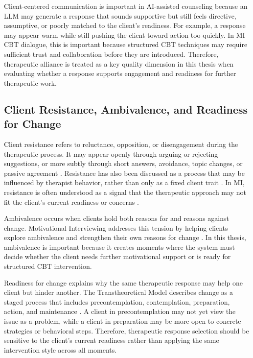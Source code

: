 Client-centered communication is important in AI-assisted counseling because an LLM may generate a response that sounds supportive but still feels directive, assumptive, or poorly matched to the client's readiness. For example, a response may appear warm while still pushing the client toward action too quickly. In MI-CBT dialogue, this is important because structured CBT techniques may require sufficient trust and collaboration before they are introduced. Therefore, therapeutic alliance is treated as a key quality dimension in this thesis when evaluating whether a response supports engagement and readiness for further therapeutic work.

\subsection{Client Resistance, Ambivalence, and Readiness for Change}

Client resistance refers to reluctance, opposition, or disengagement during the therapeutic process. It may appear openly through arguing or rejecting suggestions, or more subtly through short answers, avoidance, topic changes, or passive agreement \cite{patterson1985therapist,patterson1994functional}. Resistance has also been discussed as a process that may be influenced by therapist behavior, rather than only as a fixed client trait \cite{beutler2002resistance}. In MI, resistance is often understood as a signal that the therapeutic approach may not fit the client's current readiness or concerns \cite{miller2013motivational}.

Ambivalence occurs when clients hold both reasons for and reasons against change. Motivational Interviewing addresses this tension by helping clients explore ambivalence and strengthen their own reasons for change \cite{miller2013motivational,bischof2021motivational}. In this thesis, ambivalence is important because it creates moments where the system must decide whether the client needs further motivational support or is ready for structured CBT intervention.

Readiness for change explains why the same therapeutic response may help one client but hinder another. The Transtheoretical Model describes change as a staged process that includes precontemplation, contemplation, preparation, action, and maintenance \cite{prochaska1997transtheoretical,raihan2023stages}. A client in precontemplation may not yet view the issue as a problem, while a client in preparation may be more open to concrete strategies or behavioral steps. Therefore, therapeutic response selection should be sensitive to the client's current readiness rather than applying the same intervention style across all moments.

